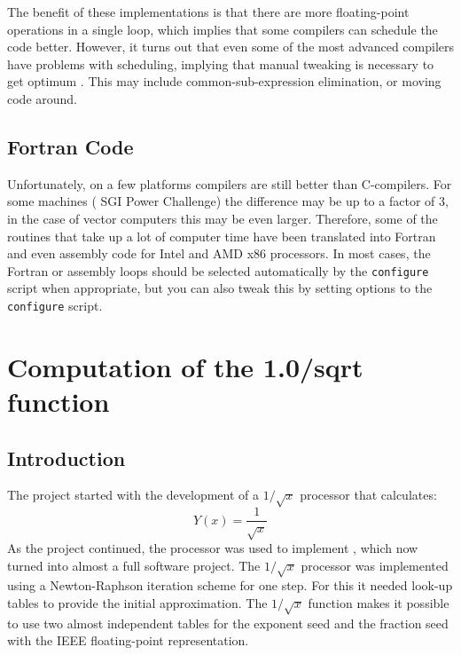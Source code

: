 The benefit of these implementations is that there are more floating-point
operations in a single loop, which implies that some compilers
can schedule the code better. However, it turns out that even
some of the most advanced compilers have problems with scheduling, 
implying that manual tweaking is necessary to get optimum 
.
This may include common-sub-expression elimination, or moving
code around. 

\subsection{Fortran Code}
Unfortunately, on a few platforms  compilers are
still better than C-compilers. For some machines ({\eg} SGI
Power Challenge) the difference may be up to a factor of 3, in the
case of vector computers this may be even larger. Therefore, some of
the routines that take up a lot of computer time have been translated
into Fortran and even assembly code for Intel and AMD x86 processors.
In most cases, the Fortran or assembly loops should be selected 
automatically by the {\tt configure} script when appropriate, but you can
also tweak this by setting options to the {\tt configure} script.

\section{Computation of the 1.0/sqrt function}
\label{sec:sqrt}
\subsection{Introduction}
The {\gromacs} project started with the development of a $1/\sqrt{x}$
processor that calculates:
\begin{equation}
Y(x) = \frac{1}{ \sqrt{x} }
\end{equation}
As the project continued, the {\intel} processor was used to implement
{\gromacs}, which now turned into almost a full software project.  The
$1/\sqrt{x}$ processor was implemented using a Newton-Raphson
iteration scheme for one step. For this it needed look-up tables to
provide the initial approximation. The $1/\sqrt{x}$ function makes it
possible to use two almost independent tables for the exponent seed
and the fraction seed with the IEEE floating-point representation.

